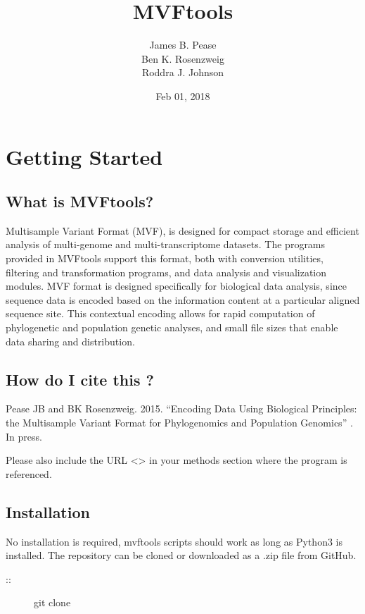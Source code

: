 \documentclass[letterpaper,11pt,english]{sphinxmanual}
\title{MVFtools}
\date{Feb 01, 2018}
\author{James B. Pease\\Ben K. Rosenzweig\\Roddra J. Johnson}
\begin{document}
\maketitle
\sphinxtableofcontents
{}\label{\detokenize{index::doc}}



\chapter{Getting Started}
\label{\detokenize{intro:welcome-to-mvftools-s-documentation}}\label{\detokenize{intro:getting-started}}\label{\detokenize{intro:intro}}\label{\detokenize{intro::doc}}

\section{What is MVFtools?}
\label{\detokenize{intro:what-is-mvftools}}
Multisample Variant Format (MVF), is designed for compact storage and efficient analysis of multi-genome and multi-transcriptome datasets.  The programs provided in MVFtools support this format, both with conversion utilities, filtering and transformation programs, and data analysis and visualization modules.  MVF format is designed specifically for biological data analysis, since sequence data is encoded based on the information content at a particular aligned sequence site.  This contextual encoding allows for rapid computation of phylogenetic and population genetic analyses, and small file sizes that enable data sharing and distribution.


\section{How do I cite this ?}
\label{\detokenize{intro:how-do-i-cite-this}}
Pease JB and BK Rosenzweig. 2015. “Encoding Data Using Biological Principles: the Multisample Variant Format for Phylogenomics and Population Genomics” . In press. 

Please also include the URL \textless{}\textgreater{} in your methods section where the program is referenced.


\section{Installation}
\label{\detokenize{intro:installation}}
No installation is required, mvftools scripts should work as long as Python3 is installed.  The repository can be cloned or downloaded as a .zip file from GitHub.
\begin{description}
\item[{::}] \leavevmode
git clone 

\end{description}
\end{document}
